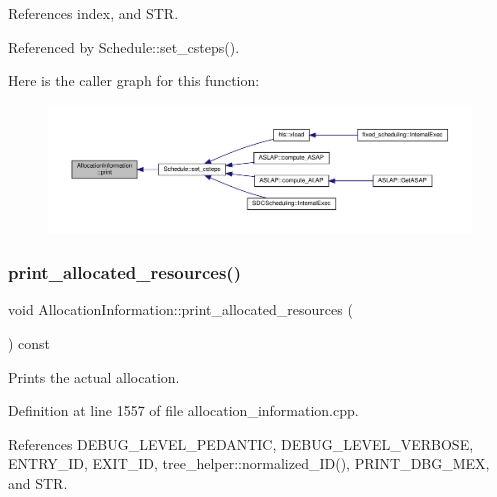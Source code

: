 References index, and S\+TR.



Referenced by Schedule\+::set\+\_\+csteps().

Here is the caller graph for this function\+:
\nopagebreak
\begin{figure}[H]
\begin{center}
\leavevmode
\includegraphics[width=350pt]{d7/d79/classAllocationInformation_ad6f604848ae5eac8768c95cb9e7e4e49_icgraph}
\end{center}
\end{figure}
\mbox{\label{classAllocationInformation_a9ecf70563f77983034205f506e59728a}} 
\subsubsection{\texorpdfstring{print\+\_\+allocated\+\_\+resources()}{print\_allocated\_resources()}}
{\footnotesize\ttfamily void Allocation\+Information\+::print\+\_\+allocated\+\_\+resources (\begin{DoxyParamCaption}{ }\end{DoxyParamCaption}) const}



Prints the actual allocation. 



Definition at line 1557 of file allocation\+\_\+information.\+cpp.



References D\+E\+B\+U\+G\+\_\+\+L\+E\+V\+E\+L\+\_\+\+P\+E\+D\+A\+N\+T\+IC, D\+E\+B\+U\+G\+\_\+\+L\+E\+V\+E\+L\+\_\+\+V\+E\+R\+B\+O\+SE, E\+N\+T\+R\+Y\+\_\+\+ID, E\+X\+I\+T\+\_\+\+ID, tree\+\_\+helper\+::normalized\+\_\+\+I\+D(), P\+R\+I\+N\+T\+\_\+\+D\+B\+G\+\_\+\+M\+EX, and S\+TR.



